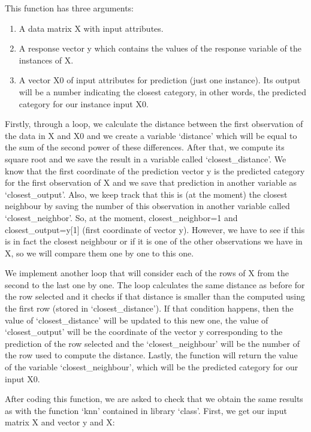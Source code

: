 \documentclass[
]{article}
\begin{document}
This function has three arguments:

\begin{enumerate}
\def\labelenumi{\arabic{enumi}.}
\item
  A data matrix X with input attributes.
\item
  A response vector y which contains the values of the response variable
  of the instances of X.
\item
  A vector X0 of input attributes for prediction (just one instance).
  Its output will be a number indicating the closest category, in other
  words, the predicted category for our instance input X0.
\end{enumerate}

Firstly, through a loop, we calculate the distance between the first
observation of the data in X and X0 and we create a variable `distance'
which will be equal to the sum of the second power of these differences.
After that, we compute its square root and we save the result in a
variable called `closest\_distance'. We know that the first coordinate
of the prediction vector y is the predicted category for the first
observation of X and we save that prediction in another variable as
`closest\_output'. Also, we keep track that this is (at the moment) the
closest neighbour by saving the number of this observation in another
variable called `closest\_neighbor'. So, at the moment,
closest\_neighbor=1 and closest\_output=y{[}1{]} (first coordinate of
vector y). However, we have to see if this is in fact the closest
neighbour or if it is one of the other observations we have in X, so we
will compare them one by one to this one.

We implement another loop that will consider each of the rows of X from
the second to the last one by one. The loop calculates the same distance
as before for the row selected and it checks if that distance is smaller
than the computed using the first row (stored in `closest\_distance').
If that condition happens, then the value of `closest\_distance' will be
updated to this new one, the value of `closest\_output' will be the
coordinate of the vector y corresponding to the prediction of the row
selected and the `closest\_neighbour' will be the number of the row used
to compute the distance. Lastly, the function will return the value of
the variable `closest\_neighbour', which will be the predicted category
for our input X0.

After coding this function, we are asked to check that we obtain the
same results as with the function `knn' contained in library `class'.
First, we get our input matrix X and vector y and X:
\end{document}
